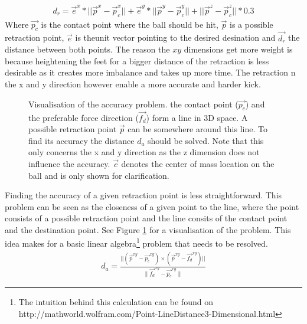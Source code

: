 \documentclass[a4paper]{article}
\begin{document}
\begin{align}
    d_r = \vec{e}^{x} * || \vec{p}^{x} -\vec{p}_{c}^{x}|| + \vec{e}^y *
||\vec{p}^{y} - \vec{p}_{c}^y|| +  ||
\vec{p}^z - \vec{p}_{c}^z|| * 0.3
\end{align}
Where $\vec{p_c}$ is the contact point where the ball should be hit,
$\vec{p}$ is a possible retraction point, $\vec{e}$ is theunit vector pointing
to the desired desination and $\vec{d_r}$ the distance between both
points. The reason the ${xy}$ dimensions get more weight is because heightening
the feet for a bigger distance of the retraction is less desirable as it creates
more imbalance and takes up more time. The retraction n the x and y direction
however enable a more accurate and harder kick.

\begin{figure}
  \resizebox{\textwidth}{!} {
    }
    \caption{Visualisation of the accuracy problem. \small{the contact point
            ($\vec{p_c}$) and the preferable force direction ($\vec{f_d}$) form a line
    in 3D space. A possible retraction point $\vec{p}$ can be somewhere around
    this line. To find its accuracy the distance $d_a$ should be solved. Note that
    this only concerns the x and y direction as the z dimension does not
    influence the accuracy. $\vec{c}$ denotes the center of mass
    location on the ball and is only shown for clarification.}}
    \label{fig:accuracy}
\end{figure}    

Finding the accuracy of a given retraction point is less straightforward. This
problem can be seen as the closeness of a given point to the line, where the
point consists of a possible retraction point and the line consits of the
contact point and the destination point. See Figure \ref{fig:accuracy} for a
visualisation of the problem. This idea makes for a basic linear algebra\footnote{The intuition behind this calculation can be found on http://mathworld.wolfram.com/Point-LineDistance3-Dimensional.html }
problem that needs to be resolved.
\begin{align*}
    d_a = \frac{||(\vec{p}^{xy} -\vec{p_c}^{xy}) \times (\vec{p}^{xy} -
    \vec{f_d}^{xy})||}{\|\vec{f_d}^{xy}- \vec{p_c}^{xy}\|}
\end{align*}
\end{document}
